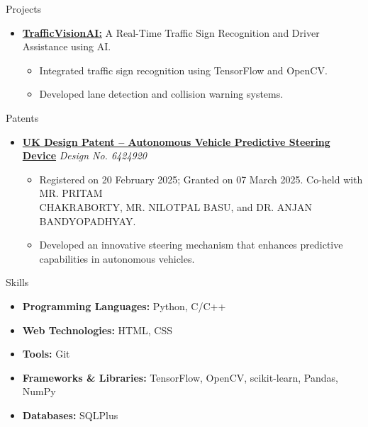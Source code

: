 \documentclass{resume} %
\begin{document}
\begin{rSection}{Projects}
\begin{itemize}
    \item{\href{https://github.com/mystichronicle/TrafficVisionAI}{{\bf TrafficVisionAI:}} 
    A Real-Time Traffic Sign Recognition and Driver Assistance using AI.\vspace{-2pt} 
    \begin{itemize}\setlength{\itemsep}{-6pt}
        \item Integrated traffic sign recognition using TensorFlow and OpenCV.
        \item Developed lane detection and collision warning systems.
    \end{itemize}}
    
\end{itemize}
\end{rSection}\vspace{-5pt}

\begin{rSection}{Patents}
\begin{itemize}\setlength{\itemsep}{-4pt}
    \item {\href{https://mystichronicle.github.io/patent-uk-1/}{\bf UK Design Patent -- Autonomous Vehicle Predictive Steering Device} \hfill {\em Design No. 6424920}\vspace{-2pt} 
    \begin{itemize}\setlength{\itemsep}{-6pt}
    \item Registered on 20 February 2025; Granted on 07 March 2025. Co-held with MR. PRITAM\\  
     CHAKRABORTY, MR. NILOTPAL BASU, and DR. ANJAN BANDYOPADHYAY.
    \item Developed an innovative steering mechanism that enhances predictive capabilities in autonomous vehicles.
    \end{itemize}}
    
\end{itemize}
\end{rSection}\vspace{-5pt}

\begin{rSection}{Skills}
\begin{itemize}\setlength{\itemsep}{-6pt}
    \item {\bf Programming Languages:} Python, C/C++
    \item {\bf Web Technologies:} HTML, CSS
    \item {\bf Tools:} Git
    \item {\bf Frameworks \& Libraries:} TensorFlow, OpenCV, scikit-learn, Pandas, NumPy
    \item {\bf Databases:} SQLPlus
\end{itemize}
\end{rSection}\vspace{-5pt}
\end{document}
